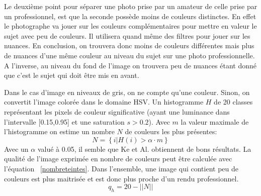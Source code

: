 \documentclass[11pt, french,screen]{report-rd-info}
\begin{document}
\begin{description}
Le deuxième point pour séparer une photo prise par un amateur de celle prise par un professionnel, est que la seconde possède moins de couleurs distinctes. En effet le photographe va jouer sur les couleurs complémentaires pour mettre en valeur le sujet avec peu de couleurs. Il utilisera quand même des filtres pour jouer sur les nuances. En conclusion, on trouvera donc moins de couleurs différentes mais plus de nuances d’une même couleur au niveau du sujet sur une photo professionnelle. A l’inverse, au niveau du fond de l’image on trouvera peu de nuances étant donné que c’est le sujet qui doit être mis en avant.

Dans le cas d'image en niveaux de gris, on ne compte qu'une couleur. Sinon, on convertit l'image colorée dans le domaine HSV. Un histogramme $H$ de 20 classes représentant les pixels de couleur significative (ayant une luminance dans l'intervalle [0.15,0.95] et une saturation $s > 0.2$). Avec $m$ la valeur maximale de l'histogramme on estime un nombre $N$ de couleurs les plus présentes: 
\begin{equation}
N = \left\{i|H(i)>\alpha \cdot m\right\}
\end{equation}
Avec un $\alpha$ valué à 0.05, il semble que Ke et Al. obtiennent de bons résultats. La qualité de l'image exprimée en nombre de couleurs peut être calculée avec l'équation ~\ref{nombreteintes}. Dans l'ensemble, une image qui contient peu de couleurs est plus maitrisée et est donc plus proche d'un rendu professionnel. 
\begin{equation}
q_h = 20 - ||N||
\label{nombreteintes}
\end{equation}


\end{description}
\end{document}

